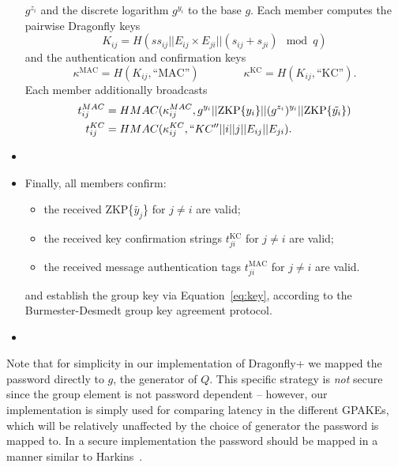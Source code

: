 \begin{itemize}
        $g^{z_i}$ and the discrete logarithm $g^{y_i}$ to the base $g$. Each member computes the pairwise Dragonfly keys
        \[ K_{ij} = H(ss_{ij} || E_{ij} \times E_{ji} || (s_{ij} + s_{ji}) \mod q)\]
        and the authentication and confirmation keys
        \[\kappa^{\text{MAC}} = H(K_{ij}, \text{``MAC''})\qquad\qquad \kappa^{\text{KC}} = H(K_{ij}, \text{``KC''}).\]
        Each member additionally broadcasts 
         \begin{align*}
         t_{ij}^{MAC} &= HMAC(\kappa_{ij}^{MAC},  g^{y_i} || \text{ZKP}\{y_i\} || (g^{z_i})^{y_i} || \text{ZKP}\{\tilde{y_i}\}) \\
        t_{ij}^{KC} &= HMAC(\kappa_{ij}^{KC}, ``KC'' || i || j || E_{ij} || E_{ji}).
        \end{align*}
    \item[]
    \item[] Finally, all members confirm:
        \begin{itemize}
            \item the received ZKP\{$\tilde{y_j}$\} for $j \neq i$ are valid;
            \item the received key confirmation strings $t^{\text{KC}}_{ji}$ for $j \neq i$ are valid;
            \item the received message authentication tags $t^{\text{MAC}}_{ji}$ for $j \neq i$ are valid.
        \end{itemize}
        and establish the group key via Equation~\eqref{eq:key}, according to the Burmester-Desmedt group key agreement protocol. 
        \item[] 
\end{itemize}

Note that for simplicity in our implementation of Dragonfly+ we mapped the password directly to $g$, the generator of $Q$. This specific strategy is \emph{not} secure since the group element is not password dependent -- however, our implementation is simply used for comparing latency in the different GPAKEs, which will be relatively unaffected by the choice of generator the password is mapped to.  In a secure implementation the password should be mapped in a manner similar to Harkins~\cite{Ha15}.



